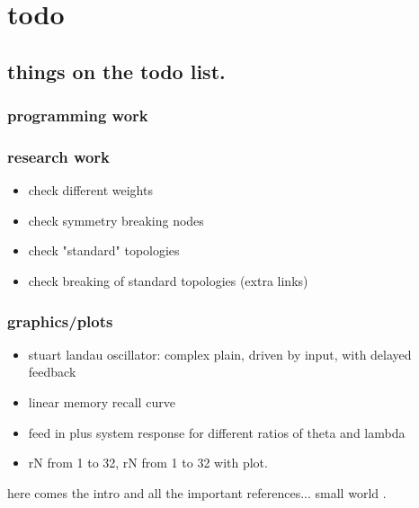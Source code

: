 \chapter{todo}

\section{things on the todo list.}

\subsection{programming work}

\subsection{research work}
\begin{itemize}
    \item check different weights
    \item check symmetry breaking nodes
    \item check "standard" topologies
    \item check breaking of standard topologies (extra links)
\end{itemize}

\subsection{graphics/plots}
\begin{itemize}
	\item stuart landau oscillator: complex plain, driven by input, with delayed feedback
	\item linear memory recall curve
    \item feed in plus system response for different ratios of theta and lambda
    \item rN from 1 to 32, rN from 1 to 32 with plot.
\end{itemize}

here comes the intro and all the important references...
small world \cite{WAT98}.

